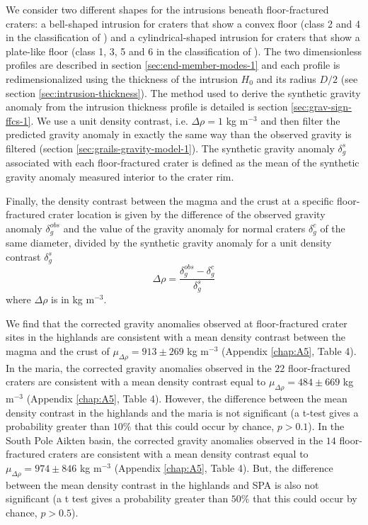 We  consider   two  different   shapes  for  the   intrusions  beneath
floor-fractured craters: a bell-shaped intrusion for craters that show
a   convex  floor   (class  2   and   4  in   the  classification   of
\citet{Schultz:1976kt}) and a cylindrical-shaped intrusion for craters
that  show  a   plate-like  floor  (class  1,  3,  5   and  6  in  the
classification  of  \citet{Schultz:1976kt}).   The  two  dimensionless
profiles  are described  in  section \ref{sec:end-member-modes-1}  and
each profile is redimensionalized using the thickness of the intrusion
$H_0$      and      its       radius      $D/2$      (see      section
\ref{sec:intrusion-thickness}).   The   method  used  to   derive  the
synthetic  gravity anomaly  from  the intrusion  thickness profile  is
detailed is section \ref{sec:grav-sign-ffcs-1}.  We use a unit density
contrast, i.e.   $\Delta \rho  = 1$  kg m$^{-3}$  and then  filter the
predicted gravity  anomaly in exactly  the same way than  the observed
gravity is  filtered (section  \ref{sec:grails-gravity-model-1}).  The
synthetic   gravity   anomaly   $\delta_g^s$  associated   with   each
floor-fractured crater is defined as the mean of the synthetic gravity
anomaly measured interior to the crater rim.
  
Finally, the  density contrast between  the magma  and the crust  at a
specific floor-fractured crater location is given by the difference of
the observed  gravity anomaly  $\delta_g^{obs}$ and  the value  of the
gravity anomaly for normal craters  $\delta_g^c$ of the same diameter,
divided by the  synthetic gravity anomaly for a  unit density contrast
$\delta_g^s$
\begin{equation}
  \Delta \rho = \frac{\delta_{g}^{obs}-\delta_{g}^c}{\delta_{g}^{s}}
\end{equation}
where $\Delta \rho$ is in kg m$^{-3}$.

We   find   that  the   corrected   gravity   anomalies  observed   at
floor-fractured crater  sites in the  highlands are consistent  with a
mean   density  contrast   between  the   magma  and   the  crust   of
$\mu_{\Delta   \rho}  =   913  \pm   269  $   kg  m$^{-3}$   (Appendix
\ref{chap:A5},  Table  4).   In   the  maria,  the  corrected  gravity
anomalies observed in the  $22$ floor-fractured craters are consistent
with       a      mean       density      contrast       equal      to
$\mu_{\Delta \rho} = 484 \pm 669$ kg m$^{-3}$ (Appendix \ref{chap:A5},
Table 4).  However,  the difference between the  mean density contrast
in the  highlands and the maria  is not significant (a  t-test gives a
probability  greater than  $10\%$  that this  could  occur by  chance,
$p >  0.1$).  In the  South Pole  Aikten basin, the  corrected gravity
anomalies observed in the  $14$ floor-fractured craters are consistent
with       a      mean       density      contrast       equal      to
$\mu_{\Delta   \rho}  =   974  \pm   846  $   kg  m$^{-3}$   (Appendix
\ref{chap:A5}, Table 4).  But, the difference between the mean density
contrast in  the highlands and SPA  is also not significant  (a t test
gives  a probability  greater than  $50\%$  that this  could occur  by
chance, $p > 0.5$).


